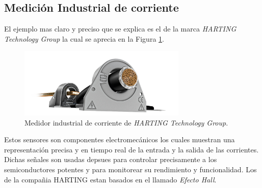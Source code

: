 \documentclass[letterpaper, 12pt]{article}
\begin{document}
    \newpage
    \begin{justify}
        \setcounter{page}{1}
        \thispagestyle{fancy}
        \section{Medición Industrial de corriente}
        \justify
        El ejemplo mas claro y preciso que se explica es el de la marca \emph{HARTING Technology Group} la cual se aprecia en la Figura \ref{fig:MedHalt}.
        \begin{figure}[H]
            \centering
            \includegraphics[width=8cm]{HARTING.jpg}
            \caption{Medidor industrial de corriente de \emph{HARTING Technology Group}.}
            \label{fig:MedHalt}
        \end{figure}
        \justify
        Estos sensores son componentes electromecánicos los cuales muestran una representación precisa y en tiempo real de la entrada y la salida de las corrientes.
        Dichas señales son usadas depsues para controlar precisamente a los semiconductores potentes y para monitorear su rendimiento y funcionalidad. Los de la compañia HARTING
        estan basados en el llamado \emph{Efecto Hall}.

\end{justify}
\end{document}

